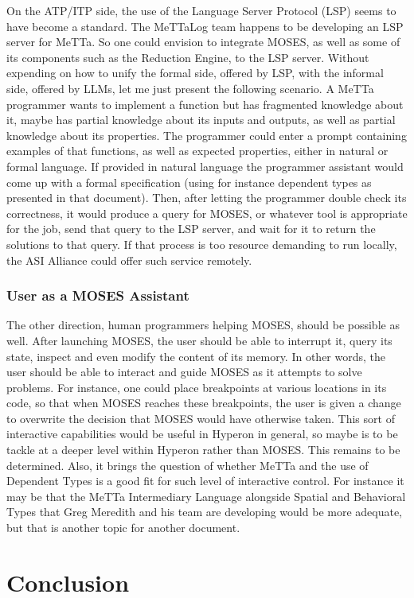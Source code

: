 \documentclass[]{report}
\begin{document}
On the ATP/ITP side, the use of the Language Server Protocol (LSP)
seems to have become a standard.  The MeTTaLog team happens to be
developing an LSP server for MeTTa.  So one could envision to
integrate MOSES, as well as some of its components such as the
Reduction Engine, to the LSP server.  Without expending on how to
unify the formal side, offered by LSP, with the informal side, offered
by LLMs, let me just present the following scenario.  A MeTTa
programmer wants to implement a function but has fragmented knowledge
about it, maybe has partial knowledge about its inputs and outputs, as
well as partial knowledge about its properties.  The programmer could
enter a prompt containing examples of that functions, as well as
expected properties, either in natural or formal language.  If
provided in natural language the programmer assistant would come up
with a formal specification (using for instance dependent types as
presented in that document).  Then, after letting the programmer
double check its correctness, it would produce a query for MOSES, or
whatever tool is appropriate for the job, send that query to the LSP
server, and wait for it to return the solutions to that query.  If
that process is too resource demanding to run locally, the ASI
Alliance could offer such service remotely.

\subsection{User as a MOSES Assistant}

The other direction, human programmers helping MOSES, should be
possible as well.  After launching MOSES, the user should be able to
interrupt it, query its state, inspect and even modify the content of
its memory.  In other words, the user should be able to interact and
guide MOSES as it attempts to solve problems.  For instance, one could
place breakpoints at various locations in its code, so that when MOSES
reaches these breakpoints, the user is given a change to overwrite the
decision that MOSES would have otherwise taken.  This sort of
interactive capabilities would be useful in Hyperon in general, so
maybe is to be tackle at a deeper level within Hyperon rather than
MOSES.  This remains to be determined.  Also, it brings the question
of whether MeTTa and the use of Dependent Types is a good fit for such
level of interactive control.  For instance it may be that the MeTTa
Intermediary Language alongside Spatial and Behavioral Types that Greg
Meredith and his team are developing would be more adequate, but that
is another topic for another document.

\chapter{Conclusion}

 
\end{document}
